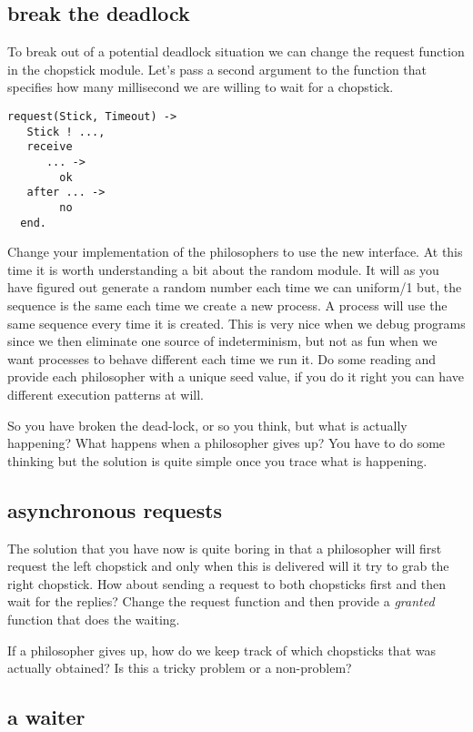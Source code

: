\documentclass[a4paper,11pt]{article}
\begin{document}
\subsection{break the deadlock}

To break out of a potential deadlock situation we can change the
request function in the chopstick module. Let's pass a second argument
to the function that specifies how many millisecond we are willing to
wait for a chopstick.

\begin{verbatim}
request(Stick, Timeout) ->
   Stick ! ...,
   receive 
      ... ->
        ok
   after ... -> 
        no  
  end.
\end{verbatim}

Change your implementation of the philosophers to use the new
interface. At this time it is worth understanding a bit about the
random module. It will as you have figured out generate a random
number each time we can uniform/1 but, the sequence is the same each
time we create a new process. A process will use the same sequence
every time it is created. This is very nice when we debug programs
since we then eliminate one source of indeterminism, but not as fun
when we want processes to behave different each time we run it. Do
some reading and provide each philosopher with a unique seed value, if
you do it right you can have different execution patterns at will.

So you have broken the dead-lock, or so you think, but what is
actually happening? What happens when a philosopher gives up? You have
to do some thinking but the solution is quite simple once you trace
what is happening.


\subsection{asynchronous requests}

The solution that you have now is quite boring in that a philosopher
will first request the left chopstick and only when this is delivered
will it try to grab the right chopstick. How about sending a request
to both chopsticks first and then wait for the replies? Change the
request function and then provide a {\em granted} function that does
the waiting. 

If a philosopher gives up, how do we keep track of which chopsticks
that was actually obtained? Is this a tricky problem or a non-problem?

\subsection{a waiter}
\end{document}
